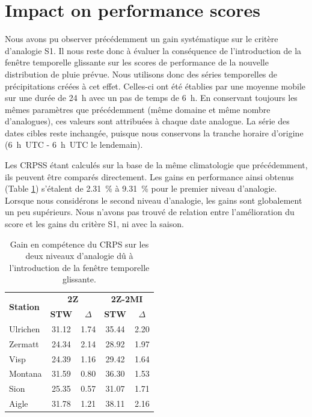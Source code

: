 \documentclass[hess]{copernicus}
\begin{document}
\section{Impact on performance scores}

Nous avons pu observer précédemment un gain systématique sur le critère d'analogie S1. Il nous reste donc à évaluer la conséquence de l'introduction de la fenêtre temporelle glissante sur les scores de performance de la nouvelle distribution de pluie prévue. Nous utilisons donc des séries temporelles de précipitations créées à cet effet. Celles-ci ont été établies par une moyenne mobile sur une durée de 24~h avec un pas de temps de 6~h. En conservant toujours les mêmes paramètres que précédemment (même domaine et même nombre d'analogues), ces valeurs sont attribuées à chaque date analogue. La série des dates cibles reste inchangée, puisque nous conservons la tranche horaire d'origine (6~h~UTC - 6~h~UTC le lendemain). 

Les CRPSS étant calculés sur la base de la même climatologie que précédemment, ils peuvent être comparés directement. Les gains en performance ainsi obtenus (Table \ref{tab:fenetre_glissante:Gains_CRPSS}) s'étalent de 2.31~\% à 9.31~\% pour le premier niveau d'analogie. Lorsque nous considérons le second niveau d'analogie, les gains sont globalement un peu supérieurs. Nous n'avons pas trouvé de relation entre l'amélioration du score et les gains du critère S1, ni avec la saison.


\begin{table}[htb]
	\caption{Gain en compétence du CRPS sur les deux niveaux d'analogie dû à l'introduction de la fenêtre temporelle glissante.}
	\begin{center}
		\begin{tabular}{l c c c c}
			\hline
			\multirow{2}{*}{\textbf{Station}} & \multicolumn{2}{c}{\textbf{2Z}} & \multicolumn{ 2}{c}{\textbf{2Z-2MI}} \\
			& \textbf{STW} & \textbf{$\Delta$} & \textbf{STW} & \textbf{$\Delta$} \\
			\hline
			Ulrichen & 31.12 & 1.74 & 35.44 & 2.20 \\
			Zermatt & 24.34 & 2.14 & 28.92 & 1.97 \\
			Visp & 24.39 & 1.16 & 29.42 & 1.64 \\
			Montana & 31.59 & 0.80 & 36.30 & 1.53 \\
			Sion & 25.35 & 0.57 & 31.07 & 1.71 \\
			Aigle & 31.78 & 1.21 & 38.11 & 2.16 \\ 
			\hline
		\end{tabular}
	\end{center}
	\label{tab:fenetre_glissante:Gains_CRPSS}
\end{table}
\end{document}

